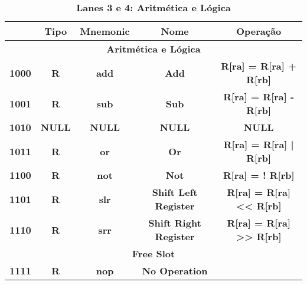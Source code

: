 \documentclass{article}
\begin{document}
    \begin{table}[H]
      \centering
      \captionsetup{labelformat=empty, skip=0pt}
      \caption{\textbf{Lanes 3 e 4: Aritmética e Lógica}}
      \noindent\hspace*{-1cm}%
      \begin{tabular}{|c|*{4}{c|}}
        \hline
        \rowcolor{gray!50}
        \multicolumn{1}{|c|}{\textbf{Opcode}} & \multicolumn{1}{|c|}{\textbf{Tipo}} & \multicolumn{1}{|c|}{\textbf{Mnemonic}} & \multicolumn{1}{|c|}{\textbf{Nome}}                    & \multicolumn{1}{|c|}{\textbf{Operação}}  \\ \hline
        \multicolumn{5}{|c|}{\textbf{Aritmética e Lógica}} \\ \hline 
        \multicolumn{1}{|c|}{\textbf{1000}}    & \multicolumn{1}{c|}{\textbf{R}}    & \multicolumn{1}{c|}{\textbf{add}}       & \multicolumn{1}{c|}{\textbf{Add}}                     & \multicolumn{1}{c|}{\textbf{R[ra] = R[ra] + R[rb]}}  \\ \hline
        \multicolumn{1}{|c|}{\textbf{1001}}    & \multicolumn{1}{c|}{\textbf{R}}    & \multicolumn{1}{c|}{\textbf{sub}}       & \multicolumn{1}{c|}{\textbf{Sub}}                     & \multicolumn{1}{c|}{\textbf{R[ra] = R[ra] - R[rb]}}  \\ \hline
        \multicolumn{1}{|c|}{\textbf{1010}}    & \multicolumn{1}{c|}{\textbf{NULL}} & \multicolumn{1}{c|}{\textbf{NULL}}        & \multicolumn{1}{c|}{\textbf{NULL}}                      & \multicolumn{1}{c|}{\textbf{NULL}}  \\ \hline
        \multicolumn{1}{|c|}{\textbf{1011}}    & \multicolumn{1}{c|}{\textbf{R}}    & \multicolumn{1}{c|}{\textbf{or}}       & \multicolumn{1}{c|}{\textbf{Or}}                     & \multicolumn{1}{c|}{\textbf{R[ra] = R[ra] | R[rb]}}  \\ \hline
        \multicolumn{1}{|c|}{\textbf{1100}}    & \multicolumn{1}{c|}{\textbf{R}}    & \multicolumn{1}{c|}{\textbf{not}}       & \multicolumn{1}{c|}{\textbf{Not}}                     & \multicolumn{1}{c|}{\textbf{R[ra] = ! R[rb]}}  \\ \hline
        \multicolumn{1}{|c|}{\textbf{1101}}    & \multicolumn{1}{c|}{\textbf{R}}    & \multicolumn{1}{c|}{\textbf{slr}}       & \multicolumn{1}{c|}{\textbf{Shift Left Register}}                     & \multicolumn{1}{c|}{\textbf{R[ra] = R[ra] << R[rb]}}  \\ \hline
        \multicolumn{1}{|c|}{\textbf{1110}}    & \multicolumn{1}{c|}{\textbf{R}}    & \multicolumn{1}{c|}{\textbf{srr}}       & \multicolumn{1}{c|}{\textbf{Shift Right Register}}     & \multicolumn{1}{c|}{\textbf{R[ra] = R[ra] >> R[rb]}}  \\ \hline
        \multicolumn{5}{|c|}{\textbf{Free Slot}} \\ \hline 
        \multicolumn{1}{|c|}{\textbf{1111}}    & \multicolumn{1}{c|}{\textbf{R}}    & \multicolumn{1}{c|}{\textbf{nop}}       & \multicolumn{1}{c|}{\textbf{No Operation}}   & \multicolumn{1}{c|}{\textbf{}}  \\ \hline
      \end{tabular}
    \end{table}
\end{document}
